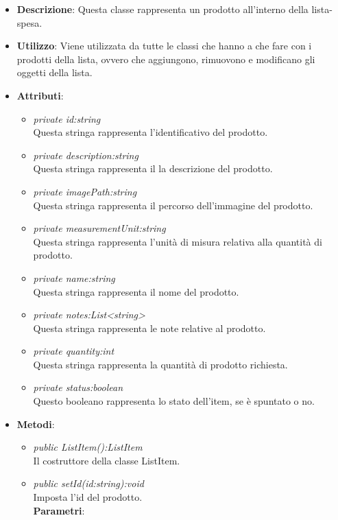 \begin{itemize}
\item \textbf{Descrizione}: Questa classe rappresenta un prodotto all'interno della lista-spesa.
\item \textbf{Utilizzo}: Viene utilizzata da tutte le classi che hanno a che fare con i prodotti della lista, ovvero che aggiungono, rimuovono e modificano gli oggetti della lista.
\item \textbf{Attributi}: 
	\begin{itemize}
	\item \textit{private id:string}\\
		Questa stringa rappresenta l'identificativo del prodotto.
	\item \textit{private description:string}\\
	Questa stringa rappresenta il la descrizione del prodotto.
	\item \textit{private imagePath:string}\\
		Questa stringa rappresenta il percorso dell'immagine del prodotto.
	\item \textit{private measurementUnit:string}\\
	Questa stringa rappresenta l'unità di misura relativa alla quantità di prodotto.
	\item \textit{private name:string}\\
	Questa stringa rappresenta il nome del prodotto.
	\item \textit{private notes:List<string>}\\
	Questa stringa rappresenta le note relative al prodotto.
	\item \textit{private quantity:int}\\
	Questa stringa rappresenta la quantità di prodotto richiesta.
	\item \textit{private status:boolean}\\
	Questo booleano rappresenta lo stato dell'item, se è spuntato o no.
	\end{itemize}
\item \textbf{Metodi}:
	\begin{itemize}
	\item \textit{public ListItem():ListItem}\\
	Il costruttore della classe ListItem.
	\item \textit{public setId(id:string):void}\\
	Imposta l'id del prodotto.
				\\ \textbf{Parametri}: \begin{itemize}

\end{itemize}
\end{itemize}
\end{itemize}
